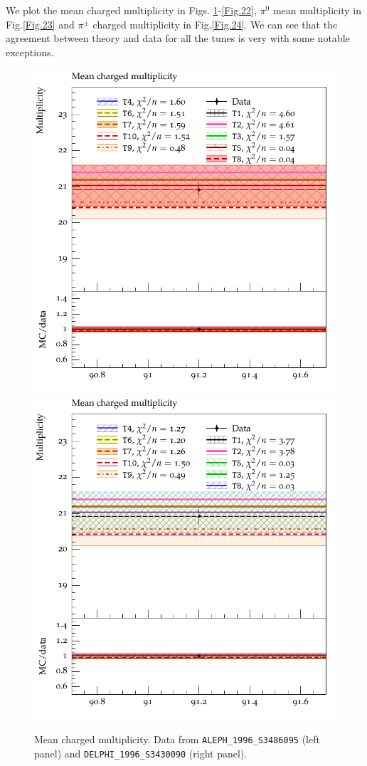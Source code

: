 \documentclass[aps,preprint,floatfix,nofootinbib,showpacs]{revtex4-1}
\begin{document}
We plot the mean charged multiplicity in Figs. \ref{Fig.20}-\ref{Fig.22}, 
$\pi^0$ mean multiplicity in Fig.\ref{Fig.23} and $\pi^\pm$ charged
multiplicity in Fig.\ref{Fig.24}. We can see 
that the agreement between theory and data for all the tunes is very
with some notable exceptions. 
 
\begin{figure}[!h]
 \centering
 \includegraphics[width=0.47\linewidth]{Figures/Mean_multiplicities/ALEPH_1996_S3486095_d19-x01-y01.pdf}
 \hfill
 \includegraphics[width=0.47\linewidth]{Figures/Mean_multiplicities/DELPHI_1996_S3430090_d35-x01-y01.pdf}
 \caption{Mean charged multiplicity. Data from \texttt{ALEPH\_1996\_S3486095} \cite{Barate:1996fi} (left panel)
 and \texttt{DELPHI\_1996\_S3430090} \cite{Abreu:1996na} (right panel).}
 \label{Fig.20}
\end{figure}
\end{document}
